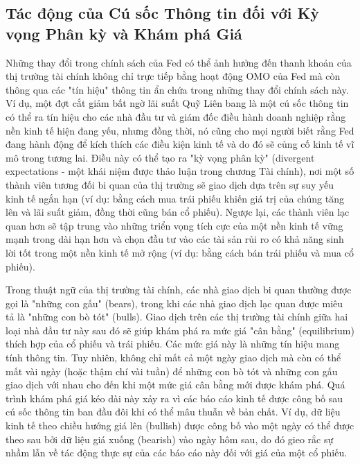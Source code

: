 \subsection{Tác động của Cú sốc Thông tin đối với Kỳ vọng Phân kỳ và Khám phá Giá}

Những thay đổi trong chính sách của Fed có thể ảnh hưởng đến thanh khoản của thị trường tài chính không chỉ trực tiếp bằng hoạt động OMO của Fed mà còn thông qua các "tín hiệu" thông tin ẩn chứa trong những thay đổi chính sách này. Ví dụ, một đợt cắt giảm bất ngờ lãi suất Quỹ Liên bang là một cú sốc thông tin có thể ra tín hiệu cho các nhà đầu tư và giám đốc điều hành doanh nghiệp rằng nền kinh tế hiện đang yếu, nhưng đồng thời, nó cũng cho mọi người biết rằng Fed đang hành động để kích thích các điều kiện kinh tế và do đó sẽ củng cố kinh tế vĩ mô trong tương lai. Điều này có thể tạo ra "kỳ vọng phân kỳ" (divergent expectations - một khái niệm được thảo luận trong chương Tài chính), nơi một số thành viên tương đối bi quan của thị trường sẽ giao dịch dựa trên sự suy yếu kinh tế ngắn hạn (ví dụ: bằng cách mua trái phiếu khiến giá trị của chúng tăng lên và lãi suất giảm, đồng thời cũng bán cổ phiếu). Ngược lại, các thành viên lạc quan hơn sẽ tập trung vào những triển vọng tích cực của một nền kinh tế vững mạnh trong dài hạn hơn và chọn đầu tư vào các tài sản rủi ro có khả năng sinh lời tốt trong một nền kinh tế mở rộng (ví dụ: bằng cách bán trái phiếu và mua cổ phiếu).

Trong thuật ngữ của thị trường tài chính, các nhà giao dịch bi quan thường được gọi là "những con gấu" (bears), trong khi các nhà giao dịch lạc quan được miêu tả là "những con bò tót" (bulls). Giao dịch trên các thị trường tài chính giữa hai loại nhà đầu tư này sau đó sẽ giúp khám phá ra mức giá "cân bằng" (equilibrium) thích hợp của cổ phiếu và trái phiếu. Các mức giá này là những tín hiệu mang tính thông tin. Tuy nhiên, không chỉ mất cả một ngày giao dịch mà còn có thể mất vài ngày (hoặc thậm chí vài tuần) để những con bò tót và những con gấu giao dịch với nhau cho đến khi một mức giá cân bằng mới được khám phá. Quá trình khám phá giá kéo dài này xảy ra vì các báo cáo kinh tế được công bố sau cú sốc thông tin ban đầu đôi khi có thể mâu thuẫn về bản chất. Ví dụ, dữ liệu kinh tế theo chiều hướng giá lên (bullish) được công bố vào một ngày có thể được theo sau bởi dữ liệu giá xuống (bearish) vào ngày hôm sau, do đó gieo rắc sự nhầm lẫn về tác động thực sự của các báo cáo này đối với giá của một cổ phiếu.

